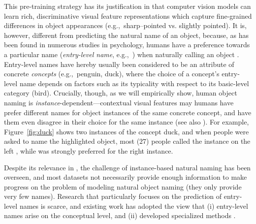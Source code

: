 This pre-training strategy has its justification in that computer vision models can learn rich, discriminative visual feature representations which capture fine-grained differences in object appearances (e.g.,\ sharp--pointed vs. slightly pointed). 
It is, however, different from predicting the natural name of an object, 
because, as has been found in numerous studies in psychology, humans have a preference towards a particular name (\textit{entry-level name}, e.g.,\ ) when naturally calling an object  \cite{rosch1976basic,Rosch1978,jolicoeur1984pictures}. 
Entry-level names have hereby usually been considered to be an attribute of concrete \textit{concepts} (e.g.,\ penguin, duck), where the choice of a concept's entry-level name depends on factors such as its typicality with respect to its basic-level category (bird).  
Crucially, though, as we will empirically show, human object naming is \textit{instance}-dependent---contextual visual features may humans have prefer different names for object instances of the same concrete concept, and have them even disagree in their choice for the same instance (see also \citealt{graf2016animal}). 
For example, Figure~\ref{fig:duck} shows two instances of the concept duck, and when people were asked to name the highlighted object, most ($27$) people called the instance on the left , while  was strongly preferred for the right instance. 

Despite its relevance in \lv, the challenge of instance-based natural naming has been overseen, and most \lv datasets not necessarily provide enough information to make progress on the problem of modeling natural object naming (they only provide very few names). 
Research that particularly focuses on the prediction of entry-level names is scarce, and existing work has adopted the view that (i) entry-level names arise on the conceptual level, and (ii) developed specialized methods \cite{Ordonez:2016}. 
%

